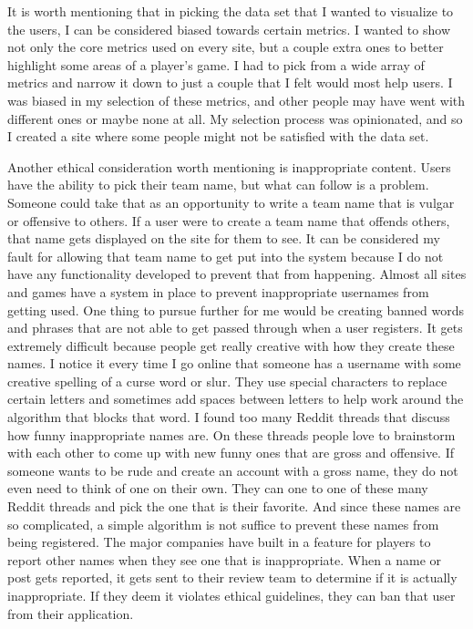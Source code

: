 \documentclass[10pt,twocolumn]{article}
\begin{document}
	It is worth mentioning that in picking the data set that I wanted to visualize to the users, I can be considered biased towards certain metrics. I wanted to show not only the core metrics used on every site, but a couple extra ones to better highlight some areas of a player's game. I had to pick from a wide array of metrics and narrow it down to just a couple that I felt would most help users. I was biased in my selection of these metrics, and other people may have went with different ones or maybe none at all. My selection process was opinionated, and so I created a site where some people might not be satisfied with the data set.
	
	Another ethical consideration worth mentioning is inappropriate content. Users have the ability to pick their team name, but what can follow is a problem. Someone could take that as an opportunity to write a team name that is vulgar or offensive to others. If a user were to create a team name that offends others, that name gets displayed on the site for them to see. It can be considered my fault for allowing that team name to get put into the system because I do not have any functionality developed to prevent that from happening. Almost all sites and games have a system in place to prevent inappropriate usernames from getting used. One thing to pursue further for me would be creating banned words and phrases that are not able to get passed through when a user registers. It gets extremely difficult because people get really creative with how they create these names. I notice it every time I go online that someone has a username with some creative spelling of a curse word or slur. They use special characters to replace certain letters and sometimes add spaces between letters to help work around the algorithm that blocks that word. I found too many Reddit threads that discuss how funny inappropriate names are. On these threads people love to brainstorm with each other to come up with new funny ones that are gross and offensive. If someone wants to be rude and create an account with a gross name, they do not even need to think of one on their own. They can one to one of these many Reddit threads and pick the one that is their favorite. And since these names are so complicated, a simple algorithm is not suffice to prevent these names from being registered. The major companies have built in a feature for players to report other names when they see one that is inappropriate. When a name or post gets reported, it gets sent to their review team to determine if it is actually inappropriate. If they deem it violates ethical guidelines, they can ban that user from their application.
	
\end{document}
